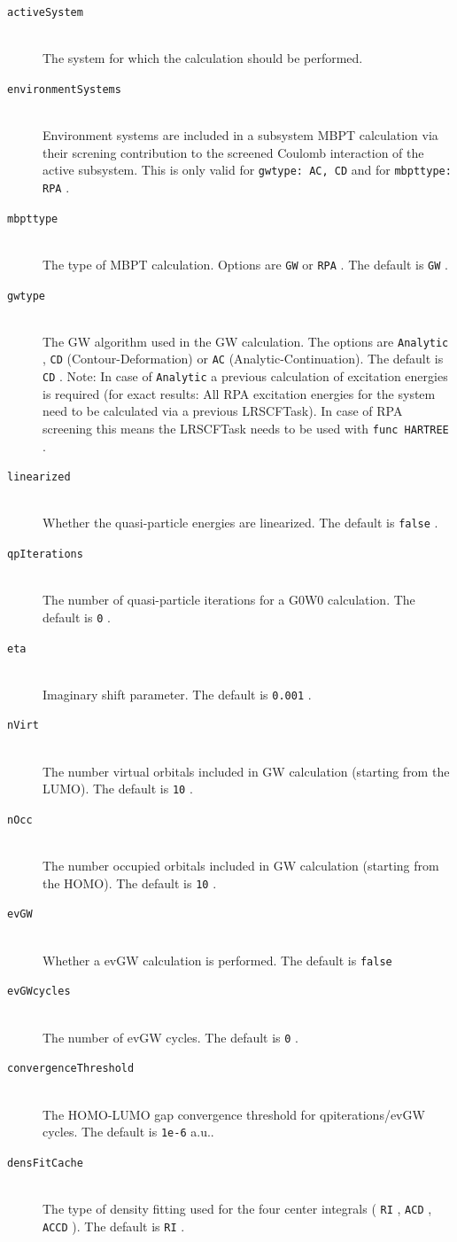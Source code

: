 \documentclass[bibliography=totocnumbered,a4paper,10pt,oneside]{scrbook}
\newcommand{\ttt}[1]{%
  \begingroup\setlength{\fboxsep}{1pt}%
  \colorbox{serenity-green!30}{\texttt{\hspace*{2pt}\vphantom{(g}#1\hspace*{2pt}}}%
  \endgroup
}
\begin{document}
\begin{description}
  \item [\texttt{activeSystem}]\hfill \\
  The system for which the calculation should be performed.
  \item [\texttt{environmentSystems}]\hfill \\
  Environment systems are included in a subsystem MBPT calculation via their screning contribution to the screened Coulomb interaction of the active subsystem. This is only valid for \ttt{gwtype: AC, CD} and for \ttt{mbpttype: RPA}.  
  \item [\texttt{mbpttype}]\hfill \\
  The type of MBPT calculation. Options are \ttt{GW} or \ttt{RPA}. The default is \ttt{GW}.
  \item [\texttt{gwtype}]\hfill \\
  The GW algorithm used in the GW calculation. The options are \ttt{Analytic}, \ttt{CD} (Contour-Deformation) or \ttt{AC} (Analytic-Continuation). The default is \ttt{CD}. Note: In case of \ttt{Analytic} a previous calculation of excitation energies is required (for exact results: All RPA excitation energies for the system need to be calculated via a previous LRSCFTask). In case of RPA screening this means the LRSCFTask needs to be used with \ttt{func HARTREE}.
  \item [\texttt{linearized}]\hfill \\
  Whether the quasi-particle energies are linearized. The default is \ttt{false}.
  \item [\texttt{qpIterations}]\hfill \\
  The number of quasi-particle iterations for a G0W0 calculation. The default is \ttt{0}.
  \item [\texttt{eta}]\hfill \\
  Imaginary shift parameter. The default is \ttt{0.001}.
  \item [\texttt{nVirt}]\hfill \\
  The number virtual orbitals included in GW calculation (starting from the LUMO). The default is \ttt{10}.
  \item [\texttt{nOcc}]\hfill \\
  The number occupied orbitals included in GW calculation (starting from the HOMO). The default is \ttt{10}.
  \item [\texttt{evGW}]\hfill \\
  Whether a evGW calculation is performed. The default is \ttt{false}
  \item [\texttt{evGWcycles}]\hfill \\
  The number of evGW cycles. The default is \ttt{0}.
  \item [\texttt{convergenceThreshold}]\hfill \\
  The HOMO-LUMO gap convergence threshold for qpiterations/evGW cycles. The default is \ttt{1e-6} a.u..
  \item [\texttt{densFitCache}]\hfill \\
  The type of density fitting used for the four center integrals (\ttt{RI},\ttt{ACD},\ttt{ACCD}). The default is \ttt{RI}.
\end{description}
\end{document}
